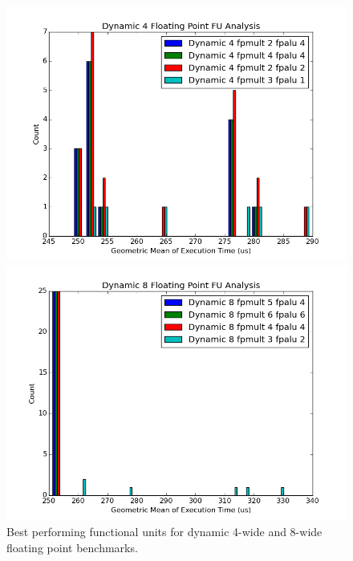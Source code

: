 \documentclass[paper=a4, fontsize=12pt]{scrartcl} %
\numberwithin{equation}{section} %
\numberwithin{figure}{section} %
\numberwithin{table}{section} %
\begin{document}
\begin{figure}
\centering
\begin{minipage}{0.5\textwidth}
\centering
	\includegraphics[width=\linewidth]{graphs/Functional_Units/hardware_float/Dynamic_4_Floating_Point_FU_Analysis.png}
\end{minipage}\hfill
\begin{minipage}{0.5\textwidth}
\centering
 \includegraphics[width=\linewidth]{graphs/Functional_Units/hardware_float/Dynamic_8_Floating_Point_FU_Analysis.png}
\end{minipage}

\caption{Best performing functional units for dynamic 4-wide and 8-wide floating point benchmarks.}
\label{fig:hardware_float}
\end{figure}
\end{document}
